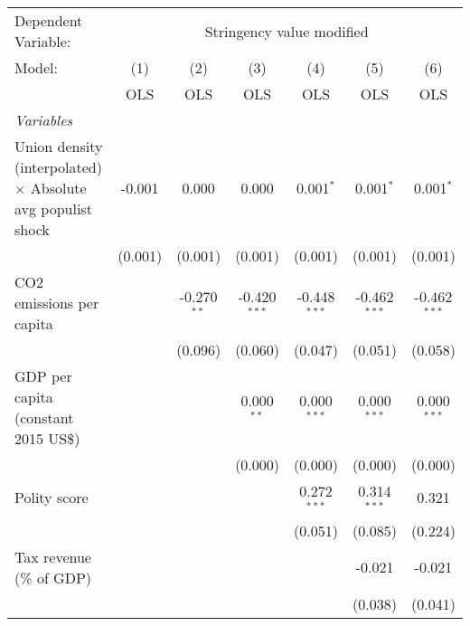 
\begingroup
\centering
\begin{tabular}{lcccccc}
   \toprule
   Dependent Variable: & \multicolumn{6}{c}{Stringency value modified}\\
   Model:                                                             & (1)     & (2)           & (3)            & (4)            & (5)            & (6)\\  
                                                                      &  OLS    & OLS           & OLS            & OLS            & OLS            & OLS\\  
   \midrule
   \emph{Variables}\\
   Union density (interpolated) $\times$ Absolute avg populist shock  & -0.001  & 0.000         & 0.000          & 0.001$^{*}$    & 0.001$^{*}$    & 0.001$^{*}$\\   
                                                                      & (0.001) & (0.001)       & (0.001)        & (0.001)        & (0.001)        & (0.001)\\   
   CO2 emissions per capita                                           &         & -0.270$^{**}$ & -0.420$^{***}$ & -0.448$^{***}$ & -0.462$^{***}$ & -0.462$^{***}$\\   
                                                                      &         & (0.096)       & (0.060)        & (0.047)        & (0.051)        & (0.058)\\   
   GDP per capita (constant 2015 US\$)                                &         &               & 0.000$^{**}$   & 0.000$^{***}$  & 0.000$^{***}$  & 0.000$^{***}$\\   
                                                                      &         &               & (0.000)        & (0.000)        & (0.000)        & (0.000)\\   
   Polity score                                                       &         &               &                & 0.272$^{***}$  & 0.314$^{***}$  & 0.321\\   
                                                                      &         &               &                & (0.051)        & (0.085)        & (0.224)\\   
   Tax revenue (\% of GDP)                                            &         &               &                &                & -0.021         & -0.021\\   
                                                                      &         &               &                &                & (0.038)        & (0.041)\\   

\end{tabular}

